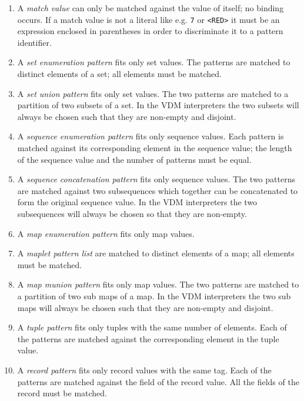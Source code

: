 \documentclass{overturerepchap}
\begin{document}
{\begin{description}
\begin{enumerate}
  \item A {\it match value} can only be matched against the value of
    itself; no binding occurs. If a match value is not a literal like e.g.
    {\tt 7} or {\tt <RED>} it must be an expression enclosed in parentheses in order to
    discriminate it to a pattern identifier.

  \item A {\it set enumeration pattern} fits only set values. The patterns
    are matched to distinct elements of a set; all elements must be
    matched.

  \item A {\it set union pattern} fits only set values. The two patterns
    are matched to a partition of two subsets of a set. In the VDM interpreters
    the two subsets will always be chosen such that they are non-empty
    and disjoint.

  \item A {\it sequence enumeration pattern} fits only sequence values.
    Each pattern is matched against its corresponding element in the
    sequence value; the length of the sequence value and the number of
    patterns must be equal.

  \item A {\it sequence concatenation pattern} fits only sequence values.
    The two patterns are matched against two subsequences which together
    can be concatenated to form the original sequence value. In the
    VDM interpreters the two subsequences will always be chosen so that they
    are non-empty.

  \item A {\it map enumeration pattern} fits only map values.

  \item A {\it maplet pattern list} are matched to distinct elements of a map;
   all elements must be matched.

  \item A {\it map munion pattern} fits only map values.
   The two patterns are matched to a partition of two sub maps of a map.
   In the VDM interpreters the two sub maps will always be chosen such that they are non-empty and disjoint.

  \item A {\it tuple pattern} fits only tuples with the same number of
    elements. Each of the patterns are matched against the corresponding
    element in the tuple value.

  \item A {\it record pattern} fits only record values with the same tag.
    Each of the patterns are matched against the field of the record value.
    All the fields of the record must be matched.


\end{enumerate}
\end{description}}
\end{document}
